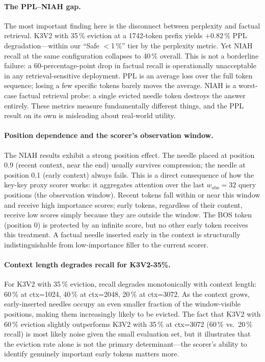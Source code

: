 \documentclass{article}
\begin{document}
\paragraph{The PPL--NIAH gap.}
The most important finding here is the disconnect between perplexity and factual
retrieval.
K3V2 with 35\,\% eviction at a 1742-token prefix yields $+0.82$\,\% PPL
degradation---within our ``Safe $<$1\,\%'' tier by the perplexity metric.
Yet NIAH recall at the same configuration collapses to 40\,\% overall.
This is not a borderline failure: a 60-percentage-point drop in factual recall
is operationally unacceptable in any retrieval-sensitive deployment.
PPL is an average loss over the full token sequence; losing a few specific
tokens barely moves the average.
NIAH is a worst-case factual retrieval probe: a single evicted needle token
destroys the answer entirely.
These metrics measure fundamentally different things, and the PPL result on its
own is misleading about real-world utility.

\paragraph{Position dependence and the scorer's observation window.}
The NIAH results exhibit a strong position effect.
The needle placed at position 0.9 (recent context, near the end) usually
survives compression; the needle at position 0.1 (early context) always fails.
This is a direct consequence of how the key-key proxy scorer works: it
aggregates attention over the last $w_\text{obs}{=}32$ query positions
(the observation window).
Recent tokens fall within or near this window and receive high importance
scores; early tokens, regardless of their content, receive low scores simply
because they are outside the window.
The BOS token (position 0) is protected by an infinite score, but no other
early token receives this treatment.
A factual needle inserted early in the context is structurally indistinguishable
from low-importance filler to the current scorer.

\paragraph{Context length degrades recall for K3V2-35\%.}
For K3V2 with 35\,\% eviction, recall degrades monotonically with context length:
60\,\% at ctx=1024, 40\,\% at ctx=2048, 20\,\% at ctx=3072.
As the context grows, early-inserted needles occupy an even smaller fraction of
the window-visible positions, making them increasingly likely to be evicted.
The fact that K3V2 with 60\,\% eviction slightly outperforms K3V2 with 35\,\%
at ctx=3072 (60\,\% vs.\ 20\,\% recall) is most likely noise given the small
evaluation set, but it illustrates that the eviction rate alone is not the
primary determinant---the scorer's ability to identify genuinely important
early tokens matters more.
\end{document}
